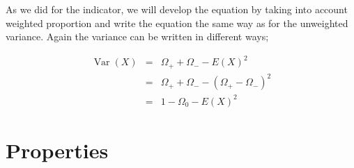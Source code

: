 \documentclass[12pt,a4paper,oneside]{book}
\DeclareMathOperator{\Var}{Var}
\begin{document}
As we did for the indicator, we will develop the equation by taking into account weighted proportion and write the equation the same way as for the unweighted variance. 
Again the variance can be written in different ways;

\begin{eqnarray}
\Var(X) &=& \Omega_+ + \Omega_- - E ( X )^2 \\
	&=& \Omega_+ + \Omega_- - ( \Omega_+ - \Omega_- )^2 \\
    &=& 1 - \Omega_{0} - E(X)^2 \label{eq:var3 weighted}
\end{eqnarray}


\section{Properties}
    \label{sec:properties variance}
\end{document}
